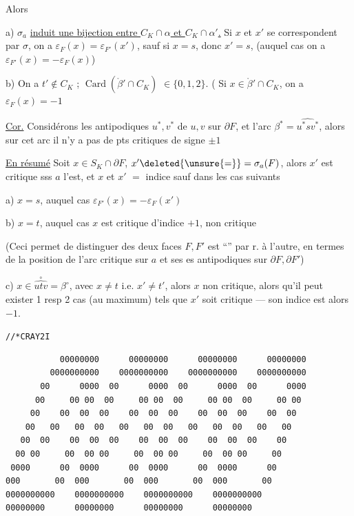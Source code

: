 Alors

a)  $\sigma_a$ \uline{induit une bijection entre $C_K\cap\alpha$ et $C_K\cap\alpha'$.}  Si $x$ et $x'$ se correspondent par $\sigma$, on a $\varepsilon_F(x)=\varepsilon_{F'}(x')$, sauf si $x=s$, donc $x'=s$, (auquel cas on a $\varepsilon_{F'}(x)=-\varepsilon_F(x)$)

b) On a $t'\notin C_K$ ;   $\operatorname{Card}(\mathring{\beta}'\cap C_K)$  $\in\{0,1,2\}$. (   Si $x\in\mathring{\beta}'\cap C_K$, on a $\varepsilon_F(x)=-1$

\uline{Cor.} Considérons les antipodiques $u^*,v^*$ de $u,v$ sur $\partial F$, et l'arc $\beta^*=\widehat{u^*sv^*}$,  alors sur cet arc il n'y a pas de pts critiques de signe $\pm1$

\uline{En résumé} \quad Soit $x\in S_K\cap\partial F$,  $x'\deleted{\unsure{=}}=\sigma_a(F)$, alors $x'$ est critique sss $a$ l'est, et $x$ et $x'$  $=$ indice sauf dans les cas suivants

a) $x=s$, auquel cas $\varepsilon_{F'}(x)=-\varepsilon_F(x')$

b) $x=t$, auquel cas  $x$ est critique d'indice $+1$,  non critique

(Ceci permet de distinguer   des deux faces $F,F'$ est ``'' par r. à l'autre, en termes de la position de l'arc critique  sur $a$ et ses es antipodiques sur $\partial F,\partial F'$)

c) $x\in\overset{\circ}{\widehat{utv}}=\beta^\circ$, avec $x\ne t$ i.e. $x'\ne t'$, alors $x$ non critique, alors qu'il peut exister 1 resp 2 cas (au maximum) tels que $x'$ soit critique --- son indice est alors $-1$.


\texttt{//*\quad CRAY2\qquad I}

{\scriptsize
\begin{verbatim}
           00000000      00000000      00000000      00000000
         0000000000    0000000000    0000000000    0000000000
       00      0000  00      0000  00      0000  00      0000
      00     00 00  00     00 00  00     00 00  00     00 00
     00    00  00  00    00  00  00    00  00  00    00  00
    00   00   00  00   00   00  00   00   00  00   00   00
   00  00    00  00  00    00  00  00    00  00  00    00
  00 00     00  00 00     00  00 00     00  00 00     00
 0000      00  0000      00  0000      00  0000      00
000       00  000       00  000       00  000       00
0000000000    0000000000    0000000000    0000000000
00000000      00000000      00000000      00000000
\end{verbatim}
}

